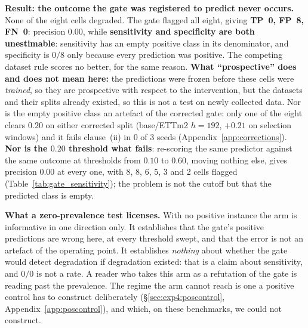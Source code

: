 \textbf{Result: the outcome the gate was registered to predict never occurs.}
None of the eight cells degraded.  The gate flagged all eight, giving
\textbf{TP~0, FP~8, FN~0}: precision $0.00$, while \textbf{sensitivity and
specificity are both unestimable}: sensitivity has an empty positive class in its
denominator, and specificity is $0/8$ only because every prediction was positive.
The competing dataset rule scores no better, for the same reason.  \textbf{What
``prospective'' does and does not mean here:} the predictions were frozen before
these cells were \emph{trained}, so they are prospective with respect to the
intervention, but the datasets and their splits already existed, so this is not a
test on newly collected data.  Nor is the empty positive class an artefact of the
corrected gate: only one of the eight clears $0.20$ on either corrected split
(base/ETTm2 $h{=}192$, $+0.21$ on selection windows) and it fails clause~(ii) in 0
of 3 seeds (Appendix~\ref{app:corrections}).  \textbf{Nor is the $0.20$ threshold
what fails}: re-scoring the same predictor against the same outcome at thresholds
from $0.10$ to $0.60$, moving nothing else, gives precision $0.00$ at every one,
with 8, 8, 6, 5, 3 and 2 cells flagged (Table~\ref{tab:gate_sensitivity}); the
problem is not the cutoff but that the predicted class is empty.

\textbf{What a zero-prevalence test licenses.} With no positive instance the arm
is informative in one direction only. It establishes that the gate's positive
predictions are wrong here, at every threshold swept, and that the error is not an
artefact of the operating point. It establishes \emph{nothing} about whether the
gate would detect degradation if degradation existed: that is a claim about
sensitivity, and $0/0$ is not a rate. A reader who takes this arm as a refutation
of the gate is reading past the prevalence. The regime the arm cannot reach is
one a positive control has to construct deliberately
(\S\ref{sec:exp4:poscontrol}, Appendix~\ref{app:poscontrol}), and which, on
these benchmarks, we could not construct.

